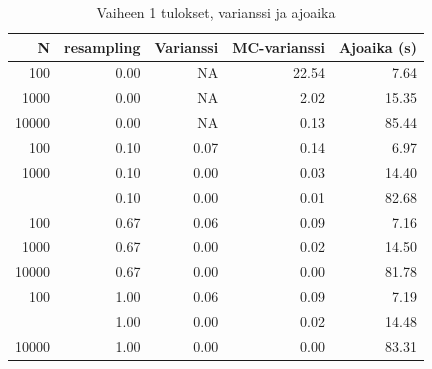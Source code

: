 \documentclass[
  12pt,
  a4paper, twoside]{book}
\begin{document}
\begin{table}

\caption{\label{tab:vaihe-1-tulokset-varianssi}Vaiheen 1 tulokset, varianssi ja ajoaika}
\centering
\begin{tabular}[t]{rrrrr}
\toprule
N & resampling & Varianssi & MC-varianssi & Ajoaika (s)\\
\midrule
100 & 0.00 & NA & 22.54 & 7.64\\
1000 & 0.00 & NA & 2.02 & 15.35\\
10000 & 0.00 & NA & 0.13 & 85.44\\
100 & 0.10 & 0.07 & 0.14 & 6.97\\
1000 & 0.10 & 0.00 & 0.03 & 14.40\\
\addlinespace
10000 & 0.10 & 0.00 & 0.01 & 82.68\\
100 & 0.67 & 0.06 & 0.09 & 7.16\\
1000 & 0.67 & 0.00 & 0.02 & 14.50\\
10000 & 0.67 & 0.00 & 0.00 & 81.78\\
100 & 1.00 & 0.06 & 0.09 & 7.19\\
\addlinespace
1000 & 1.00 & 0.00 & 0.02 & 14.48\\
10000 & 1.00 & 0.00 & 0.00 & 83.31\\
\bottomrule
\end{tabular}
\end{table}

\clearpage
\end{document}

